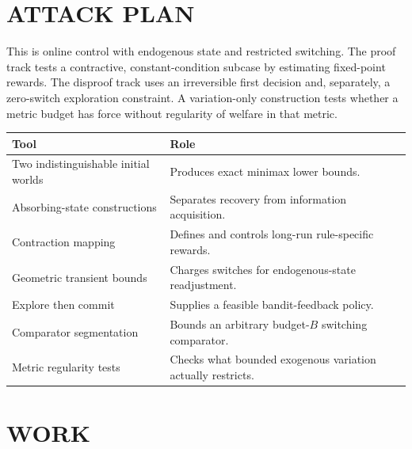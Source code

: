 \documentclass[11pt,a4paper]{article}
\theoremstyle{remark}\newtheorem{remark}[theorem]{Remark}
\begin{document}
\section{ATTACK PLAN}
This is online control with endogenous state and restricted switching. The proof track tests a contractive, constant-condition subcase by estimating fixed-point rewards. The disproof track uses an irreversible first decision and, separately, a zero-switch exploration constraint. A variation-only construction tests whether a metric budget has force without regularity of welfare in that metric.

\begin{center}\begin{tabular}{p{.25\linewidth}p{.66\linewidth}}\toprule Tool&Role\\\midrule
Two indistinguishable initial worlds&Produces exact minimax lower bounds.\\
Absorbing-state constructions&Separates recovery from information acquisition.\\
Contraction mapping&Defines and controls long-run rule-specific rewards.\\
Geometric transient bounds&Charges switches for endogenous-state readjustment.\\
Explore then commit&Supplies a feasible bandit-feedback policy.\\
Comparator segmentation&Bounds an arbitrary budget-$B$ switching comparator.\\
Metric regularity tests&Checks what bounded exogenous variation actually restricts.\\\bottomrule\end{tabular}\end{center}

\section{WORK}
\end{document}
